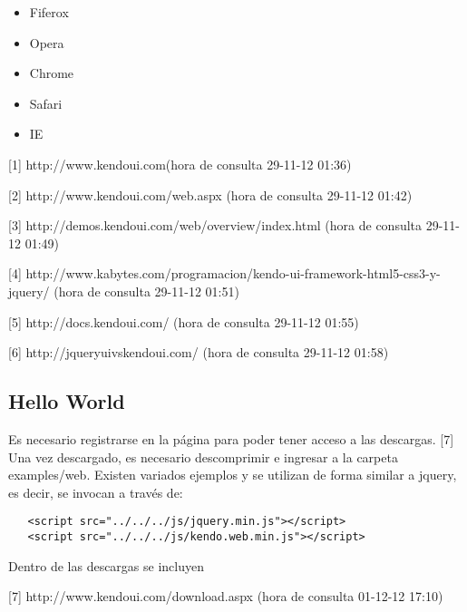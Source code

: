 \begin{itemize}
 \item Fiferox
 \item Opera
 \item Chrome
 \item Safari
 \item IE
\end{itemize}


[1] http://www.kendoui.com(hora de consulta 29-11-12 01:36)

[2] http://www.kendoui.com/web.aspx (hora de consulta 29-11-12 01:42)

[3] http://demos.kendoui.com/web/overview/index.html (hora de consulta 29-11-12 01:49)

[4] http://www.kabytes.com/programacion/kendo-ui-framework-html5-css3-y-jquery/ (hora de consulta 29-11-12 01:51)

[5] http://docs.kendoui.com/ (hora de consulta 29-11-12 01:55)

[6] http://jqueryuivskendoui.com/ (hora de consulta 29-11-12 01:58)


\subsection{Hello World}
Es necesario registrarse en la página para poder tener acceso a las descargas. [7]\\

Una vez descargado, es necesario descomprimir e ingresar a la carpeta examples/web. Existen variados ejemplos
y se utilizan de forma similar  a jquery, es decir, se invocan a través de:

\begin{verbatim}
   <script src="../../../js/jquery.min.js"></script>
   <script src="../../../js/kendo.web.min.js"></script>
\end{verbatim}

Dentro de las descargas se incluyen  

[7] http://www.kendoui.com/download.aspx (hora de consulta 01-12-12 17:10)